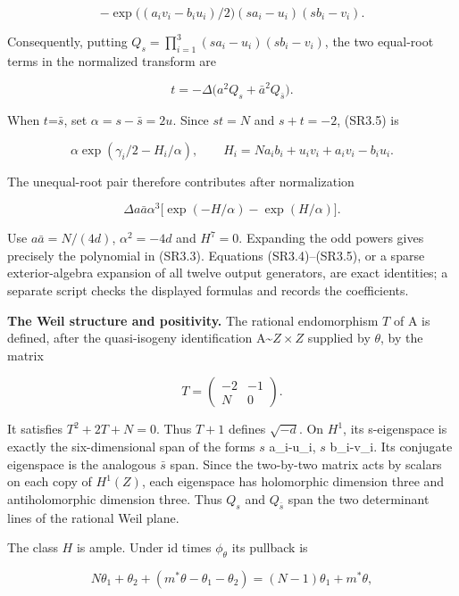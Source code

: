 \[
-\exp\bigl((a_i v_i-b_i u_i)/2\bigr)(s a_i-u_i)(s b_i-v_i).
\]

Consequently, putting \(Q_s=\prod_{i=1}^3(s a_i-u_i)(s b_i-v_i)\), the two equal-root terms in the normalized transform are

\[
t=-\Delta\bigl(a^2Q_s+\bar a^2Q_{\bar s}\bigr).\tag{SR3.6}
\]

When \(t\)=\(\bar s\), set \(\alpha=s-\bar s=2u\). Since \(st=N\) and \(s+t=-2\), (SR3.5) is

\[
\alpha\exp(\gamma_i/2-H_i/\alpha),\qquad H_i=N a_i b_i+u_i v_i+a_i v_i-b_i u_i.
\]

The unequal-root pair therefore contributes after normalization

\[
\Delta a\bar a\alpha^3\bigl[\exp(-H/\alpha)-\exp(H/\alpha)\bigr].
\]

Use \(a\bar a=N/(4d)\), \(\alpha^2=-4d\) and \(H^7=0\). Expanding the odd powers gives precisely the polynomial in (SR3.3). Equations (SR3.4)--(SR3.5), or a sparse exterior-algebra expansion of all twelve output generators, are exact identities; a separate script checks the displayed formulas and records the coefficients.

\textbf{The Weil structure and positivity.} The rational endomorphism \(T\) of A is defined, after the quasi-isogeny identification A\textasciitilde{}\(Z\times Z\) supplied by \(\theta\), by the matrix

\[
T=\begin{pmatrix}-2&-1\\N&0\end{pmatrix}.
\]

It satisfies \(T^2+2T+N=0\). Thus \(T+1\) defines \(\sqrt{-d}\). On \(H^1\), its s-eigenspace is exactly the six-dimensional span of the forms \(s\) a\_i-u\_i, \(s\) b\_i-v\_i. Its conjugate eigenspace is the analogous \(\bar s\) span. Since the two-by-two matrix acts by scalars on each copy of \(H^1(Z)\), each eigenspace has holomorphic dimension three and antiholomorphic dimension three. Thus \(Q_s\) and \(Q_{\bar s}\) span the two determinant lines of the rational Weil plane.

The class \(H\) is ample. Under id times \(\phi_\theta\) its pullback is

\[
N\theta_1+\theta_2+(m^*\theta-\theta_1-\theta_2)=(N-1)\theta_1+m^*\theta,
\]

